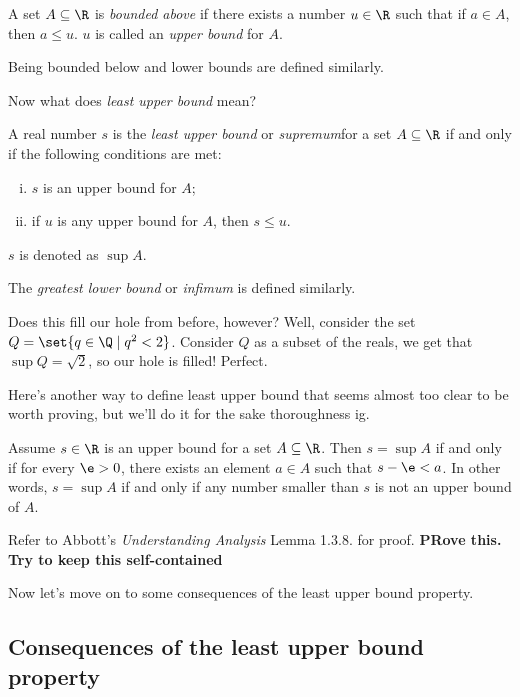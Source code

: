 \documentclass[class=article, crop=false]{standalone}
\begin{document}
\begin{defn}
    A set $A \subseteq \R$ is \textit{bounded above} if there exists a number $u \in \R$ such that if $a \in A$, then $a \leq u$. $u$ is called an \textit{upper bound} for $A$.

    Being bounded below and lower bounds are defined similarly.
\end{defn}
Now what does \textit{least upper bound} mean?
\begin{defn}
    A real number $s$ is the \textit{least upper bound} or \textit{supremum}for a set $A \subseteq \R$ if and only if the following conditions are met:
        \begin{enumerate}[(i)]
            \item $s$ is an upper bound for $A$;
            \item if $u$ is any upper bound for $A$, then $s \leq u$.
        \end{enumerate}
    $s$ is denoted as $\sup A$.

    The \textit{greatest lower bound} or \textit{infimum} is defined similarly.
\end{defn}

Does this fill our hole from before, however? Well, consider the set $Q = \set{q \in \Q \mid q^2 < 2}$. Consider $Q$ as a subset of the reals, we get that $\sup Q = \sqrt 2$, so our hole is filled! Perfect.

Here's another way to define least upper bound that seems almost too clear to be worth proving, but we'll do it for the sake thoroughness ig.

\begin{lem}{\label{lem:alt def for LUB}}
    Assume $s \in \R$ is an upper bound for a set $A \subseteq \R$. Then $s = \sup A$ if and only if for every $\e > 0$, there exists an element $a \in A$ such that $s-\e < a$. In other words, $s = \sup A$ if and only if any number smaller than $s$ is not an upper bound of $A$.
\end{lem}
\begin{pf}
    Refer to Abbott's \textit{Understanding Analysis} Lemma 1.3.8. for proof. \textbf{PRove this. Try to keep this self-contained}
\end{pf}

Now let's move on to some consequences of the least upper bound property.

\subsection{Consequences of the least upper bound property}
\end{document}
